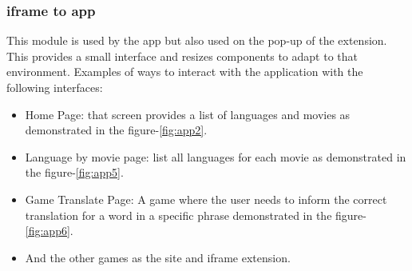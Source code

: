 \documentclass[12pt]{article}
\begin{document}
\subsubsection{iframe to app}
This module is used by the app but also used on the pop-up of the extension. This provides a small interface and resizes components to adapt to that environment. Examples of ways to interact with the application with the following interfaces:
\begin{itemize}
  \item Home Page:  that screen provides a list of languages and movies as demonstrated in the figure-\ref{fig:app2}.
  \item Language by movie page: list all languages for each movie as demonstrated in the figure-\ref{fig:app5}.
  \item Game Translate Page: A game where the user needs to inform the correct translation for a word in a specific phrase demonstrated in the figure-\ref{fig:app6}.
  \item And the other games as the site and iframe extension. 
  \end{itemize}
  
\end{document}
